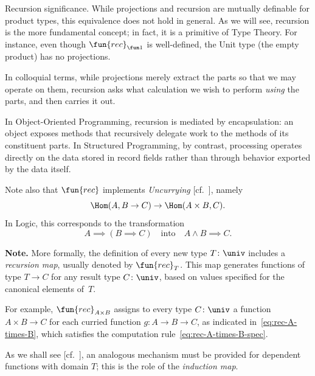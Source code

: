 \begin{lpar}{Recursion significance.}
    While projections and recursion are mutually definable for product types, this equivalence does not hold in general. As we will see, recursion is the more fundamental concept; in fact, it is a primitive of Type Theory. For instance, even though $\fun{rec}_{\fun1}$ is well-defined, the Unit type (the empty product) has no projections.

    In colloquial terms, while projections merely extract the parts so that we may operate on them, recursion asks what calculation we wish to perform \textsl{using} the parts, and then carries it out.

    In Object-Oriented Programming, recursion is mediated by encapsulation: an object exposes methods that recursively delegate work to the methods of its constituent parts. In Structured Programming, by contrast, processing operates directly on the data stored in record fields rather than through behavior exported by the data itself.

    Note also that $\fun{rec}$ implements \textsl{Uncurrying} [cf.~], namely 
    \[
        \Hom(A,B\to C)\to\Hom(A\times B,C).
    \]
    In Logic, this corresponds to the transformation 
    \[
        A\implies(B\implies C)
        \quad\text{into}\quad
        A \wedge B\implies C.
    \]

    \textbf{Note.} More formally, the definition of every new type $T\colon\univ$ includes a \textit{recursion map}, usually denoted by $\fun{rec}_T$. This map generates functions of type $T\to C$ for any result type $C\colon\univ$, based on values specified for the canonical elements of~$T$.
    
    For example, $\fun{rec}_{A\times B}$ assigns to every type $C\colon\univ$ a function $A\times B\to C$ for each curried function $g\colon A\to B\to C$, as indicated in~\eqref{eq:rec-A-times-B}, which satisfies the computation rule~\eqref{eq:rec-A-times-B-spec}.
    
    As we shall see [cf.~], an analogous mechanism must be provided for dependent functions with domain $T$; this is the role of the \textit{induction map}.

\end{lpar}

